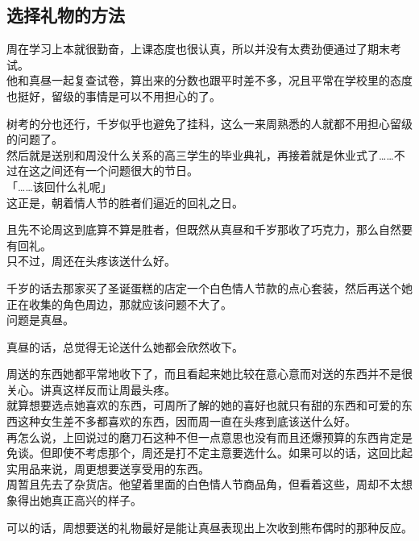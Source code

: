 \subsection{选择礼物的方法}

周在学习上本就很勤奋，上课态度也很认真，所以并没有太费劲便通过了期末考试。\\

他和真昼一起复查试卷，算出来的分数也跟平时差不多，况且平常在学校里的态度也挺好，留级的事情是可以不用担心的了。

树考的分也还行，千岁似乎也避免了挂科，这么一来周熟悉的人就都不用担心留级的问题了。\\

然后就是送别和周没什么关系的高三学生的毕业典礼，再接着就是休业式了……不过在这之间还有一个问题很大的节日。\\

「……该回什么礼呢」\\

这正是，朝着情人节的胜者们逼近的回礼之日。

且先不论周这到底算不算是胜者，但既然从真昼和千岁那收了巧克力，那么自然要有回礼。\\

只不过，周还在头疼该送什么好。

千岁的话去那家买了圣诞蛋糕的店定一个白色情人节款的点心套装，然后再送个她正在收集的角色周边，那就应该问题不大了。\\

问题是真昼。

真昼的话，总觉得无论送什么她都会欣然收下。

周送的东西她都平常地收下了，而且看起来她比较在意心意而对送的东西并不是很关心。讲真这样反而让周最头疼。\\

就算想要选点她喜欢的东西，可周所了解的她的喜好也就只有甜的东西和可爱的东西这种女生差不多都喜欢的东西，因而周一直在头疼到底该送什么好。\\

再怎么说，上回说过的磨刀石这种不但一点意思也没有而且还爆预算的东西肯定是免谈。但即使不考虑那个，周还是打不定主意要选什么。如果可以的话，这回比起实用品来说，周更想要送享受用的东西。\\

周暂且先去了杂货店。他望着里面的白色情人节商品角，但看着这些，周却不太想象得出她真正高兴的样子。

可以的话，周想要送的礼物最好是能让真昼表现出上次收到熊布偶时的那种反应。\\

